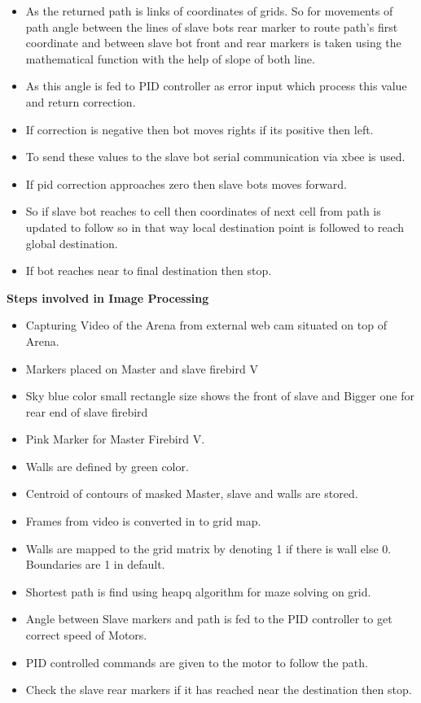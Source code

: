 \documentclass[report]{res}
\begin{document}
\begin{itemize}
	\item As the returned path is links of coordinates of grids. So for movements of path angle between the lines of slave bots rear marker to route path’s first coordinate and between slave bot front and rear markers is taken using the mathematical function with the help of slope of both line. 
	\item As this angle is fed to PID controller as error input which process this value and return correction. 
	\item If correction is negative then bot moves rights if its positive then left. 
	\item To send these values to the slave bot serial communication via xbee is used. 
	\item If pid correction approaches zero then slave bots moves forward. 
	\item So if slave bot reaches to cell then coordinates of next cell from path is updated to follow so in that way local destination point is followed to reach global destination. 
	\item If bot reaches near to final destination then stop.
	\end{itemize}
	
	\pagebreak
	
	
	\textbf{Steps involved in Image Processing}
	
	\begin{itemize}
		\item	Capturing Video of the Arena from external web cam situated on top of Arena.
		\item	Markers placed on Master and slave firebird V
		\item	Sky blue color small rectangle size shows the front of slave and Bigger one for rear end of slave firebird
		\item	Pink Marker for Master Firebird V.
		\item	Walls are defined by green color.
		\item	Centroid of contours of masked Master, slave and walls are stored.
		\item	Frames from video is converted in to grid map.
		\item	Walls are mapped to the grid matrix by denoting 1 if there is wall else 0. Boundaries are 1 in default.
		\item	Shortest path is find using heapq algorithm for maze solving on grid.
		\item	Angle between Slave markers and path is fed to the PID controller to get correct speed of Motors.
		\item	PID controlled commands are given to the motor to follow the path.
		\item	Check the slave rear markers if it has reached near the destination then stop.
	\end{itemize}
	
\end{document}
